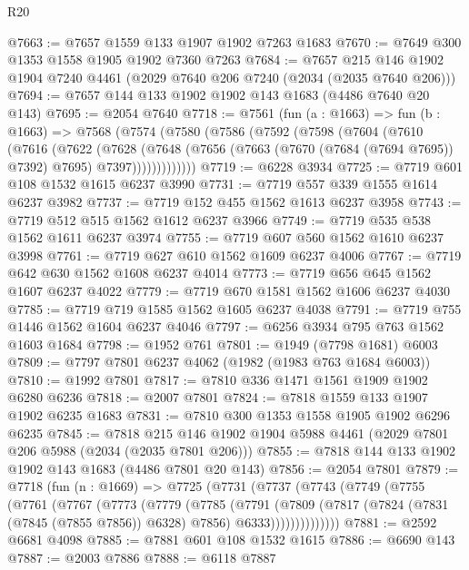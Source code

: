 \begin{lexlean}{R20}
\begin{coremodule}
@7663 := @7657 @1559 @133 @1907 @1902 @7263 @1683
@7670 := @7649 @300 @1353 @1558 @1905 @1902 @7360 @7263
@7684 := @7657 @215 @146 @1902 @1904 @7240 @4461 (@2029 @7640 @206 @7240 (@2034 (@2035 @7640 @206)))
@7694 := @7657 @144 @133 @1902 @1902 @143 @1683 (@4486 @7640 @20 @143)
@7695 := @2054 @7640
@7718 := @7561
    (fun (a : @1663) =>
    fun (b : @1663) =>
    @7568
      (@7574
        (@7580
          (@7586
            (@7592
              (@7598
                (@7604
                  (@7610
                    (@7616
                      (@7622
                        (@7628
                          (@7648
                            (@7656
                              (@7663 (@7670 (@7684 (@7694 @7695)) @7392) @7695)
                              @7397)))))))))))))
@7719 := @6228 @3934
@7725 := @7719 @601 @108 @1532 @1615 @6237 @3990
@7731 := @7719 @557 @339 @1555 @1614 @6237 @3982
@7737 := @7719 @152 @455 @1562 @1613 @6237 @3958
@7743 := @7719 @512 @515 @1562 @1612 @6237 @3966
@7749 := @7719 @535 @538 @1562 @1611 @6237 @3974
@7755 := @7719 @607 @560 @1562 @1610 @6237 @3998
@7761 := @7719 @627 @610 @1562 @1609 @6237 @4006
@7767 := @7719 @642 @630 @1562 @1608 @6237 @4014
@7773 := @7719 @656 @645 @1562 @1607 @6237 @4022
@7779 := @7719 @670 @1581 @1562 @1606 @6237 @4030
@7785 := @7719 @719 @1585 @1562 @1605 @6237 @4038
@7791 := @7719 @755 @1446 @1562 @1604 @6237 @4046
@7797 := @6256 @3934 @795 @763 @1562 @1603 @1684
@7798 := @1952 @761
@7801 := @1949 (@7798 @1681) @6003
@7809 := @7797 @7801 @6237 @4062 (@1982 (@1983 @763 @1684 @6003))
@7810 := @1992 @7801
@7817 := @7810 @336 @1471 @1561 @1909 @1902 @6280 @6236
@7818 := @2007 @7801
@7824 := @7818 @1559 @133 @1907 @1902 @6235 @1683
@7831 := @7810 @300 @1353 @1558 @1905 @1902 @6296 @6235
@7845 := @7818 @215 @146 @1902 @1904 @5988 @4461 (@2029 @7801 @206 @5988 (@2034 (@2035 @7801 @206)))
@7855 := @7818 @144 @133 @1902 @1902 @143 @1683 (@4486 @7801 @20 @143)
@7856 := @2054 @7801
@7879 := @7718
    (fun (n : @1669) =>
    @7725
      (@7731
        (@7737
          (@7743
            (@7749
              (@7755
                (@7761
                  (@7767
                    (@7773
                      (@7779
                        (@7785
                          (@7791
                            (@7809
                              (@7817
                                (@7824 (@7831 (@7845 (@7855 @7856)) @6328) @7856)
                                @6333))))))))))))))
@7881 := @2592 @6681 @4098
@7885 := @7881 @601 @108 @1532 @1615
@7886 := @6690 @143
@7887 := @2003 @7886
@7888 := @6118 @7887

\end{coremodule}
\end{lexlean}
